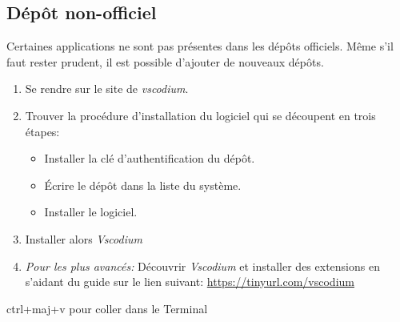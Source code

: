 \documentclass[a4paper,11pt]{article}
\begin{document}
\subsection{Dépôt non-officiel}
Certaines applications ne sont pas présentes dans les dépôts officiels. Même s'il faut rester prudent, il est possible d'ajouter de nouveaux dépôts.
\begin{activite}
\begin{enumerate}
    \item Se rendre sur le site de \emph{vscodium}.
    \item Trouver la procédure d'installation du logiciel qui se découpent en trois étapes:
    \begin{itemize}
        \item Installer la clé d'authentification du dépôt.
        \item Écrire le dépôt dans la liste du système.
        \item Installer le logiciel.
    \end{itemize}
    \item Installer alors \emph{Vscodium}
    \item \emph{Pour les plus avancés:} Découvrir \emph{Vscodium} et installer des extensions en s'aidant du guide sur le lien suivant: \url{https://tinyurl.com/vscodium}
\end{enumerate}
\end{activite}
\begin{commentprof}
ctrl+maj+v pour coller dans le Terminal
\end{commentprof}
\end{document}
